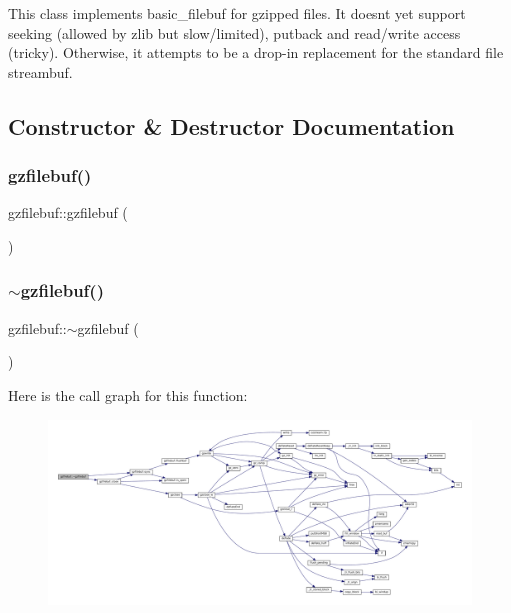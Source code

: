 This class implements basic\+\_\+filebuf for gzipped files. It doesn\textquotesingle{}t yet support seeking (allowed by zlib but slow/limited), putback and read/write access (tricky). Otherwise, it attempts to be a drop-\/in replacement for the standard file streambuf. 

\subsection{Constructor \& Destructor Documentation}
\mbox{\label{classgzfilebuf_aa08da094521bfa645427c0ae4c851504}} 
\subsubsection{\texorpdfstring{gzfilebuf()}{gzfilebuf()}\hspace{0.1cm}{\footnotesize\ttfamily [1/2]}}
{\footnotesize\ttfamily gzfilebuf\+::gzfilebuf (\begin{DoxyParamCaption}{ }\end{DoxyParamCaption})}

\mbox{\label{classgzfilebuf_a51d564cf535b373940d6cfc19c0710dc}} 
\subsubsection{\texorpdfstring{$\sim$gzfilebuf()}{~gzfilebuf()}\hspace{0.1cm}{\footnotesize\ttfamily [1/2]}}
{\footnotesize\ttfamily gzfilebuf\+::$\sim$gzfilebuf (\begin{DoxyParamCaption}{ }\end{DoxyParamCaption})\hspace{0.3cm}{\ttfamily [virtual]}}

Here is the call graph for this function\+:
\nopagebreak
\begin{figure}[H]
\begin{center}
\leavevmode
\includegraphics[width=350pt]{classgzfilebuf_a51d564cf535b373940d6cfc19c0710dc_cgraph}
\end{center}
\end{figure}
\mbox{\label{classgzfilebuf_aa08da094521bfa645427c0ae4c851504}} 
